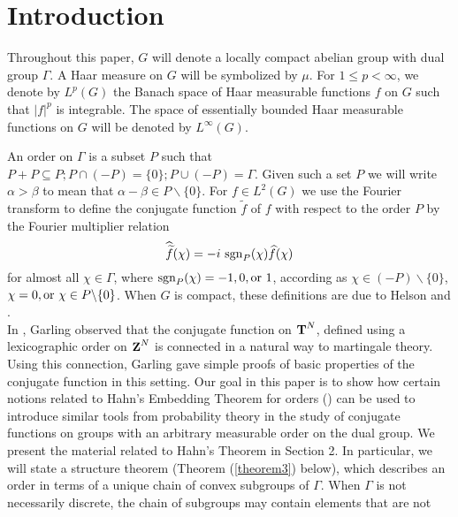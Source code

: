\section{Introduction}
%
%
%
Throughout this paper, $G$ will denote a 
locally compact abelian group with dual group 
$\Gamma$.   
A Haar measure on $G$ will be symbolized by $\mu$.  
For $1\leq p<\infty$,
we denote by $L^p(G)$ the 
Banach space of Haar measurable functions
$f$ on $G$ such that $|f|^p$
is integrable.  The space of essentially
bounded Haar measurable functions
on $G$ will be denoted by $L^\infty(G)$.


An order on $\Gamma$ is a subset 
$P$ such that 
$P+P \subseteq P; P\cap (-P)=\{0\}; P\cup (-P)=\Gamma$.  
Given such a set $P$ we will write $\alpha >\beta$ 
to mean that $\alpha - \beta \in P\backslash \{0\}$.  
For $f\in L^2(G)$ we use the Fourier 
transform to define the conjugate function 
$\widetilde{f}$ of $f$ with respect to the order 
$P$ by the Fourier multiplier relation 
\begin{equation}
\widehat{\widetilde{f}}(\chi)=- i \ {\rm sgn}_P
(\chi)\widehat{f}(\chi)
\label{conjugatefunction}
\end{equation}
%
for almost all $\chi\in\Gamma$, where  
${\rm sgn}_P (\chi)= -1, 0 ,{\rm or}\ 1$, 
according as $\chi\in(-P)\backslash \{0\}$, 
$\chi=0, {\rm or}\ \chi\in P\backslash \{0\}$.
When $G$ is compact, these definitions are due to
Helson \cite{hel1} and \cite{hel2}.\\
%
%
%
In \cite{gar}, Garling observed that the conjugate 
function on $\T^N$,
 defined using a 
lexicographic order on $\Z^N$ is 
connected in a natural way to martingale theory.  
Using this connection, 
Garling gave simple proofs of basic properties of 
the conjugate function in this setting.
Our goal in this paper is to show how
certain notions related to 
Hahn's Embedding Theorem for orders (\cite[Chapter IV]{fu})
can be used to introduce similar tools from
probability theory in the study of conjugate functions on groups
with an arbitrary measurable order on the dual group. 
We present the material related to Hahn's Theorem 
in Section 2.  In particular,
we will state a structure theorem 
(Theorem (\ref{theorem3}) below),
which describes an order in terms of a 
unique chain of convex subgroups of $\Gamma$.
When $\Gamma$ is not necessarily discrete,
the chain of subgroups may contain elements that are not

